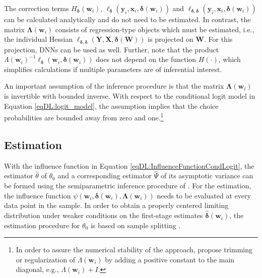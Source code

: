 \documentclass[a4paper, 12pt]{article}
\begin{document}
The correction terms $H_{\bm{\delta}}(\bm{w}_i)$, $\bm{\ell}_{\bm{\delta}}\left(\bm{y}_i, \bm{x}_i, \bm{\delta}(\bm{w}_i)\right)$ and $\bm{\ell}_{\bm{\delta},\bm{\delta}}\left(\bm{y}_i, \bm{x}_i, \bm{\delta}(\bm{w}_i)\right)$ can be calculated  analytically and do not need to be estimated.
In contrast, the matrix $\bm{\Lambda}(\bm{w}_i)$ consists of regression-type objects which must be estimated, i.e., the individual Hessian $\ell_{\bm{\delta},\bm{\delta}}(\bm{Y},\bm{X},\bm{\delta}(\bm{W}))$ is projected on $\bm{W}$. For this projection, DNNs can be used as well. 
Further, note that the product $\Lambda(\bm{w}_i)^{-1}\bm{\ell}_{\bm{\delta}}(\bm{w}_i,\bm{\delta}(\bm{w}_i))$ does not depend on the function $H(\cdot)$, which simplifies calculations if multiple parameters are of inferential interest.

An important assumption of the inference procedure is that the matrix $\bm{\Lambda}(\bm{w}_i)$ is invertible with bounded inverse. With respect to the conditional logit model in Equation \eqref{eqDL:logit_model}, the assumption implies that the choice probabilities are bounded away from zero and one.\footnote{In order to assure the numerical stability of the approach,  propose trimming or regularization of $\Lambda(\bm{w}_i)$ by adding a positive constant to the main diagonal, e.g., $\Lambda(\bm{w}_i)+I$.}
 





\subsection{Estimation}\label{secDL:inference_estimation}

With the influence function in Equation \eqref{eqDL:InfluenceFunctionCondLogit}, the estimator $\hat{\theta}$ of $\theta_0$ and a corresponding estimator $\hat{\Psi}$ of its asymptotic variance can be formed using the semiparametric inference procedure of . For the estimation, the influence function $\psi(\bm{w}_i,\bm{\delta}(\bm{w}_i),\bm{\Lambda}(\bm{w}_i))$ needs to be evaluated at every data point in the sample. In order to obtain a properly centered limiting distribution under weaker conditions on the first-stage estimates $\hat{\bm{\delta}}(\bm{w}_i)$, the estimation procedure for $\theta_0$ is based on sample splitting \cite{farrell2020}. 
\end{document}
